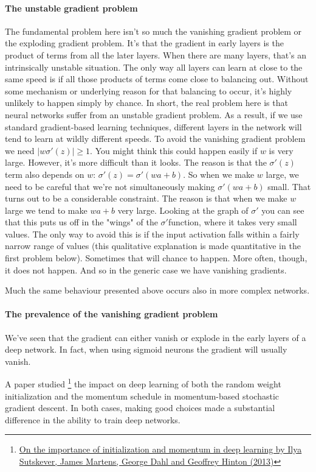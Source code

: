 \documentclass[12pt, letterpaper]{article}
\theoremstyle{definition}
\let\tb\textbf
\begin{document}
\paragraph{\tb{The unstable gradient problem}} The fundamental problem here isn't so much the vanishing gradient problem or the exploding gradient problem. It's that the gradient in early layers is the product of terms from all the later layers. When there are many layers, that's an intrinsically unstable situation. The only way all layers can learn at close to the same speed is if all those products of terms come close to balancing out. Without some mechanism or underlying reason for that balancing to occur, it's highly unlikely to happen simply by chance. In short, the real problem here is that neural networks suffer from an unstable gradient problem. As a result, if we use standard gradient-based learning techniques, different layers in the network will tend to learn at wildly different speeds. To avoid the vanishing gradient problem we need $|w\sigma'(z)|\ge 1$. You might think this could happen easily if $w$ is very large. However, it's more difficult than it looks. The reason is that the $\sigma'(z)$ term also depends on $w$: $\sigma'(z)=\sigma'(wa+b)$. So when we make $w$ large, we need to be careful that we're not simultaneously making $\sigma'(wa+b)$ small. That turns out to be a considerable constraint. The reason is that when we make $w$ large we tend to make $wa+b$ very large. Looking at the graph of $\sigma'$ you can see that this puts us off in the "wings" of the $\sigma'$function, where it takes very small values. The only way to avoid this is if the input activation falls within a fairly narrow range of values (this qualitative explanation is made quantitative in the first problem below). Sometimes that will chance to happen. More often, though, it does not happen. And so in the generic case we have vanishing gradients.

Much the same behaviour presented above occurs also in more complex networks. 

\paragraph{\tb{The prevalence of the vanishing gradient problem}} We've seen that the gradient can either vanish or explode in the early layers of a deep network. In fact, when using sigmoid neurons the gradient will usually vanish. 

A paper studied \footnote{\href{http://www.cs.toronto.edu/~hinton/absps/momentum.pdf}{On the importance of initialization and momentum in deep learning by Ilya Sutskever, James Martens, George Dahl and Geoffrey Hinton (2013)}} the impact on deep learning of both the random weight initialization and the momentum schedule in momentum-based stochastic gradient descent. In both cases, making good choices made a substantial difference in the ability to train deep networks.
\end{document}

